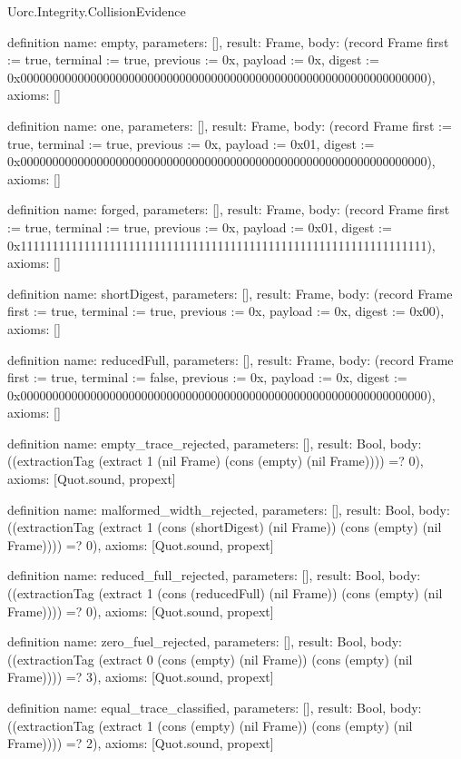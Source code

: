 \begin{lexlean}{Uorc.Integrity.CollisionEvidence}
\begin{semanticmodule}
definition{
  name: empty,
  parameters: [],
  result: Frame,
  body: (record Frame {first := true, terminal := true, previous := 0x, payload := 0x, digest := 0x0000000000000000000000000000000000000000000000000000000000000000}),
  axioms: []
}

definition{
  name: one,
  parameters: [],
  result: Frame,
  body: (record Frame {first := true, terminal := true, previous := 0x, payload := 0x01, digest := 0x0000000000000000000000000000000000000000000000000000000000000000}),
  axioms: []
}

definition{
  name: forged,
  parameters: [],
  result: Frame,
  body: (record Frame {first := true, terminal := true, previous := 0x, payload := 0x01, digest := 0x1111111111111111111111111111111111111111111111111111111111111111}),
  axioms: []
}

definition{
  name: shortDigest,
  parameters: [],
  result: Frame,
  body: (record Frame {first := true, terminal := true, previous := 0x, payload := 0x, digest := 0x00}),
  axioms: []
}

definition{
  name: reducedFull,
  parameters: [],
  result: Frame,
  body: (record Frame {first := true, terminal := false, previous := 0x, payload := 0x, digest := 0x0000000000000000000000000000000000000000000000000000000000000000}),
  axioms: []
}

definition{
  name: empty_trace_rejected,
  parameters: [],
  result: Bool,
  body: ((extractionTag (extract 1 (nil Frame) (cons (empty) (nil Frame)))) =? 0),
  axioms: [Quot.sound, propext]
}

definition{
  name: malformed_width_rejected,
  parameters: [],
  result: Bool,
  body: ((extractionTag (extract 1 (cons (shortDigest) (nil Frame)) (cons (empty) (nil Frame)))) =? 0),
  axioms: [Quot.sound, propext]
}

definition{
  name: reduced_full_rejected,
  parameters: [],
  result: Bool,
  body: ((extractionTag (extract 1 (cons (reducedFull) (nil Frame)) (cons (empty) (nil Frame)))) =? 0),
  axioms: [Quot.sound, propext]
}

definition{
  name: zero_fuel_rejected,
  parameters: [],
  result: Bool,
  body: ((extractionTag (extract 0 (cons (empty) (nil Frame)) (cons (empty) (nil Frame)))) =? 3),
  axioms: [Quot.sound, propext]
}

definition{
  name: equal_trace_classified,
  parameters: [],
  result: Bool,
  body: ((extractionTag (extract 1 (cons (empty) (nil Frame)) (cons (empty) (nil Frame)))) =? 2),
  axioms: [Quot.sound, propext]
}


\end{semanticmodule}
\end{lexlean}
